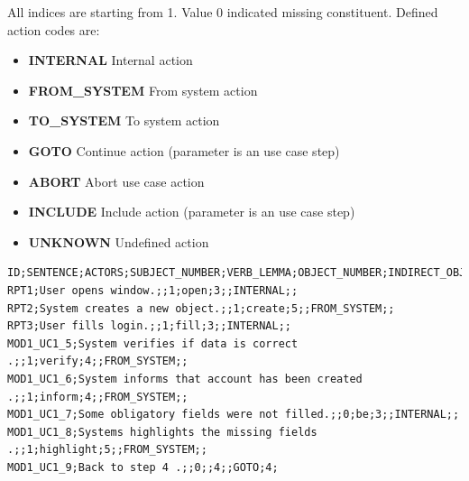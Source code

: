 All indices are starting from 1. Value 0 indicated missing constituent. Defined action codes are:      
     
\begin{itemize}
\item {\bf INTERNAL} Internal action
\item {\bf FROM\_SYSTEM} From system action
\item {\bf TO\_SYSTEM} To system action
\item {\bf GOTO} Continue action (parameter is an use case step)
\item {\bf ABORT} Abort use case action
\item {\bf INCLUDE} Include action (parameter is an use case step)
\item {\bf UNKNOWN} Undefined action
\end{itemize}     
      
\begin{table}[ht]   %
\begin{center}
    \begin{verbatim}      
ID;SENTENCE;ACTORS;SUBJECT_NUMBER;VERB_LEMMA;OBJECT_NUMBER;INDIRECT_OBJECT_NUMBER;ACTION_CODE;ACTION_PARAM1;ACTION_PARAM2
RPT1;User opens window.;;1;open;3;;INTERNAL;;
RPT2;System creates a new object.;;1;create;5;;FROM_SYSTEM;;
RPT3;User fills login.;;1;fill;3;;INTERNAL;;
MOD1_UC1_5;System verifies if data is correct .;;1;verify;4;;FROM_SYSTEM;;
MOD1_UC1_6;System informs that account has been created .;;1;inform;4;;FROM_SYSTEM;;
MOD1_UC1_7;Some obligatory fields were not filled.;;0;be;3;;INTERNAL;;
MOD1_UC1_8;Systems highlights the missing fields .;;1;highlight;5;;FROM_SYSTEM;;
MOD1_UC1_9;Back to step 4 .;;0;;4;;GOTO;4;
    \end{verbatim}
  \caption{Example input for benchmark plugin}
  \label{tab.benchmarkinput}
\end{center}
\end{table}      
      


